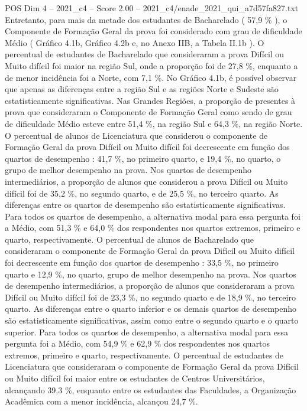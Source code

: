 \begin{textsample}{POS Dim 4 – 2021\_c4 – Score 2.00 – 2021\_c4/enade\_2021\_qui\_a7d57fa827.txt}
Entretanto, para mais da metade dos estudantes de Bacharelado ( 57,9 \% ), o Componente de Formação Geral da prova foi considerado com grau de dificuldade Médio ( Gráfico 4.1b, Gráfico 4.2b e, no Anexo IIB, a Tabela II.1b ).
O percentual de estudantes de Bacharelado que consideraram a prova Difícil ou Muito difícil foi maior na região Sul, onde a proporção foi de 27,8 \%, enquanto a de menor incidência foi a Norte, com 7,1 \%.
No Gráfico 4.1b, é possível observar que apenas as diferenças entre a região Sul e as regiões Norte e Sudeste são estatisticamente significativas.
Nas Grandes Regiões, a proporção de presentes à prova que consideraram o Componente de Formação Geral como sendo de grau de dificuldade Médio esteve entre 51,4 \%, na região Sul e 64,3 \%, na região Norte.
O percentual de alunos de Licenciatura que considerou o componente de Formação Geral da prova Difícil ou Muito difícil foi decrescente em função dos quartos de desempenho : 41,7 \%, no primeiro quarto, e 19,4 \%, no quarto, o grupo de melhor desempenho na prova.
Nos quartos de desempenho intermediários, a proporção de alunos que considerou a prova Difícil ou Muito difícil foi de 35,2 \%, no segundo quarto, e de 25,5 \%, no terceiro quarto.
As diferenças entre os quartos de desempenho são estatisticamente significativas.
Para todos os quartos de desempenho, a alternativa modal para essa pergunta foi a Médio, com 51,3 \% e 64,0 \% dos respondentes nos quartos extremos, primeiro e quarto, respectivamente.
O percentual de alunos de Bacharelado que consideraram o componente de Formação Geral da prova Difícil ou Muito difícil foi decrescente em função dos quartos de desempenho : 33,5 \%, no primeiro quarto e 12,9 \%, no quarto, grupo de melhor desempenho na prova.
Nos quartos de desempenho intermediários, a proporção de alunos que consideraram a prova Difícil ou Muito difícil foi de 23,3 \%, no segundo quarto e de 18,9 \%, no terceiro quarto.
As diferenças entre o quarto inferior e os demais quartos de desempenho são estatisticamente significativas, assim como entre o segundo quarto e o quarto superior.
Para todos os quartos de desempenho, a alternativa modal para essa pergunta foi a Médio, com 54,9 \% e 62,9 \% dos respondentes nos quartos extremos, primeiro e quarto, respectivamente.
O percentual de estudantes de Licenciatura que consideraram o componente de Formação Geral da prova Difícil ou Muito difícil foi maior entre os estudantes de Centros Universitários, alcançando 39,3 \%, enquanto entre os estudantes das Faculdades, a Organização Acadêmica com a menor incidência, alcançou 24,7 \%.

\end{textsample}
